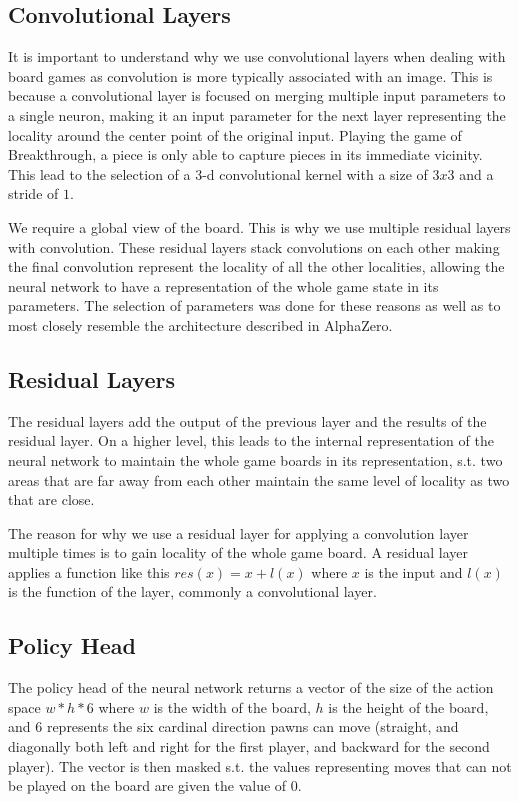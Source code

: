 \subsection{Convolutional Layers}

It is important to understand why we use convolutional layers when dealing with board games as convolution is more typically associated with an image. This is because a convolutional layer is focused on merging multiple input parameters to a single neuron, making it an input parameter for the next layer representing the locality around the center point of the original input. Playing the game of Breakthrough, a piece is only able to capture pieces in its immediate vicinity. This lead to the selection of a $3$-d convolutional kernel with a size of $3x3$ and a stride of $1$.

We require a global view of the board. This is why we use multiple residual layers with convolution. These residual layers stack convolutions on each other making the final convolution represent the locality of all the other localities, allowing the neural network to have a representation of the whole game state in its parameters. The selection of parameters was done for these reasons as well as to most closely resemble the architecture described in AlphaZero\cite{Silver:alphazero}.

\subsection{Residual Layers}

The residual layers add the output of the previous layer and the results of the residual layer. On a higher level, this leads to the internal representation of the neural network to maintain the whole game boards in its representation, s.t. two areas that are far away from each other maintain the same level of locality as two that are close.

The reason for why we use a residual layer for applying a convolution layer multiple times is to gain locality of the whole game board. A residual layer applies a function like this $res(x) = x + l(x)$ where $x$ is the input and $l(x)$ is the function of the layer, commonly a convolutional layer.

\subsection{Policy Head}

The policy head of the neural network returns a vector of the size of the action space $w * h * 6$ where $w$ is the width of the board, $h$ is the height of the board, and $6$ represents the six cardinal direction pawns can move (straight, and diagonally both left and right for the first player, and backward for the second player). The vector is then masked s.t. the values representing moves that can not be played on the board are given the value of $0$.

